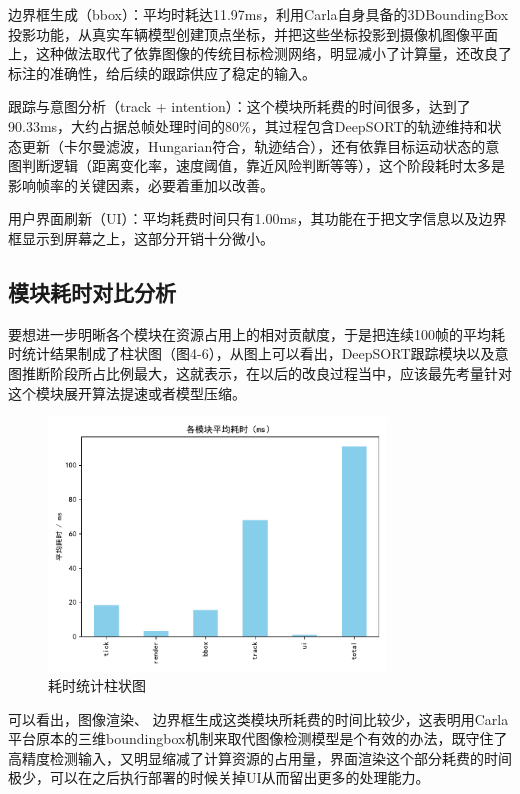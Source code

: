 边界框生成（bbox）：平均时耗达11.97ms，利用Carla自身具备的3DBoundingBox投影功能，从真实车辆模型创建顶点坐标，并把这些坐标投影到摄像机图像平面上，这种做法取代了依靠图像的传统目标检测网络，明显减小了计算量，还改良了标注的准确性，给后续的跟踪供应了稳定的输入。

跟踪与意图分析（track + intention）：这个模块所耗费的时间很多，达到了90.33ms，大约占据总帧处理时间的80\%，其过程包含DeepSORT的轨迹维持和状态更新（卡尔曼滤波，Hungarian符合，轨迹结合），还有依靠目标运动状态的意图判断逻辑（距离变化率，速度阈值，靠近风险判断等等），这个阶段耗时太多是影响帧率的关键因素，必要着重加以改善。

用户界面刷新（UI）：平均耗费时间只有1.00ms，其功能在于把文字信息以及边界框显示到屏幕之上，这部分开销十分微小。

\subsection{模块耗时对比分析}

要想进一步明晰各个模块在资源占用上的相对贡献度，于是把连续100帧的平均耗时统计结果制成了柱状图（图4-6），从图上可以看出，DeepSORT跟踪模块以及意图推断阶段所占比例最大，这就表示，在以后的改良过程当中，应该最先考量针对这个模块展开算法提速或者模型压缩。

\begin{figure}[H]
    \centering
    \includegraphics[width=0.8\textwidth]{images/图12 耗时统计柱状图.pdf}  %
    \caption{耗时统计柱状图}
    \label{fig:example_image}  %
\end{figure}

可以看出，图像渲染、 边界框生成这类模块所耗费的时间比较少，这表明用Carla平台原本的三维boundingbox机制来取代图像检测模型是个有效的办法，既守住了高精度检测输入，又明显缩减了计算资源的占用量，界面渲染这个部分耗费的时间极少，可以在之后执行部署的时候关掉UI从而留出更多的处理能力。


\begin{tabular}{l l}
\end{tabular}

